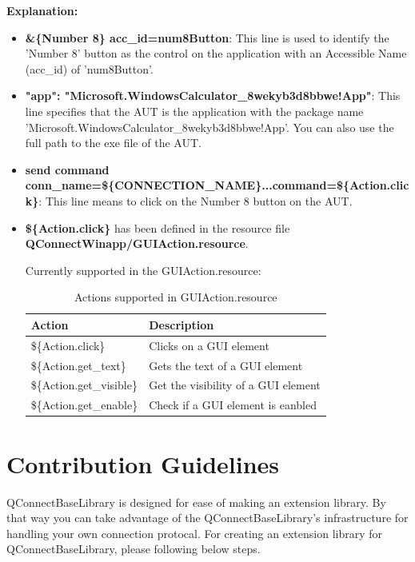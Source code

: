 \textbf{Explanation:}
\begin{itemize}
\item \colorbox{gray!16}{\textbf{\&\{Number 8\} acc\_id=num8Button}}: This line is used to identify the 'Number 8' button as the control on the application with an Accessible Name (acc\_id) of 'num8Button'.
\item \colorbox{gray!16}{\textbf{"app": "Microsoft.WindowsCalculator\_8wekyb3d8bbwe!App"}}: This line specifies that the AUT is the application with the package name 'Microsoft.WindowsCalculator\_8wekyb3d8bbwe!App'. You can also use the full path to the exe file of the AUT.
\item \colorbox{gray!16}{\textbf{send command conn\_name=\$\{CONNECTION\_NAME\}...command=\$\{Action.click\}}}: This line means to click on the Number 8 button on the AUT.
\item \colorbox{gray!16}{\textbf{\$\{Action.click\}}} has been defined in the resource file \colorbox{gray!16}{\textbf{QConnectWinapp/GUIAction.resource}}.

Currently supported in the GUIAction.resource:
\begin{table}[h]
    \centering
    \begin{tabular}{|l|l|}
        \hline
        \textbf{Action} & \textbf{Description} \\ \hline
        \$\{Action.click\} & Clicks on a GUI element \\ \hline
        \$\{Action.get\_text\} & Gets the text of a GUI element \\ \hline
        \$\{Action.get\_visible\} & Get the visibility of a GUI element \\ \hline
        \$\{Action.get\_enable\} & Check if a GUI element is eanbled \\ \hline
    \end{tabular}
    \caption{Actions supported in GUIAction.resource}
    \label{tab:actions}
\end{table}


\end{itemize}


\hypertarget{contribution-guidelines}{%
\section{Contribution Guidelines}\label{contribution-guidelines}}

QConnectBaseLibrary is designed for ease of making an extension library.
By that way you can take advantage of the QConnectBaseLibrary's
infrastructure for handling your own connection protocal. For creating
an extension library for QConnectBaseLibrary, please following below
steps.

